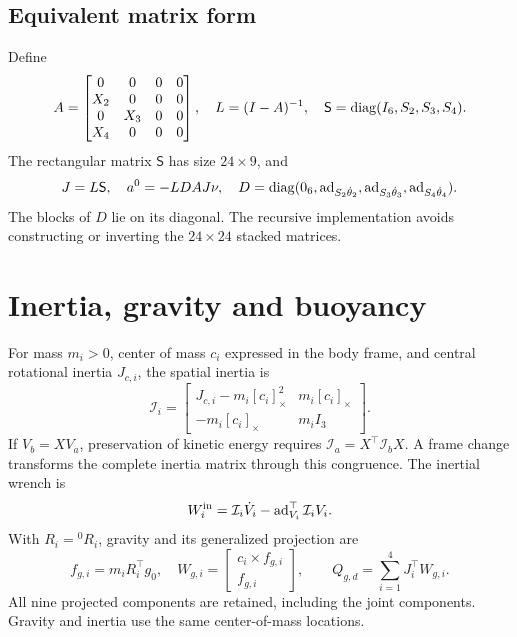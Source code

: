 \documentclass[11pt,a4paper]{article}
\newcommand{\sk}[1]{[#1]_\times}\newcommand{\E}{\mathsf E}\newcommand{\B}{\mathsf B}
\begin{document}
\subsection{Equivalent matrix form}
Define
\begin{equation}
A=\begin{bmatrix}0&0&0&0\\X_2&0&0&0\\0&X_3&0&0\\X_4&0&0&0\end{bmatrix},\quad
L=(I-A)^{-1},\quad \mathsf S=\operatorname{diag}(I_6,S_2,S_3,S_4).
\end{equation}
The rectangular matrix \(\mathsf S\) has size \(24\times9\), and
\begin{equation}
J=L\mathsf S,\quad a^0=-LDAJ\nu,\quad
D=\operatorname{diag}(0_6,\operatorname{ad}_{S_2\dot\theta_2},\operatorname{ad}_{S_3\dot\theta_3},\operatorname{ad}_{S_4\dot\theta_4}).
\label{eq:D}
\end{equation}
The blocks of \(D\) lie on its diagonal. The recursive implementation
avoids constructing or inverting the \(24\times24\) stacked matrices.
\clearpage

\section{Inertia, gravity and buoyancy}
For mass \(m_i>0\), center of mass \(c_i\) expressed in the body frame,
and central rotational inertia \(J_{c,i}\), the spatial inertia is
\begin{equation}
\mathcal I_i=\begin{bmatrix}J_{c,i}-m_i\sk{c_i}^2&m_i\sk{c_i}\\
-m_i\sk{c_i}&m_iI_3\end{bmatrix}.\label{eq:spatial}
\end{equation}
If \(V_b=XV_a\), preservation of kinetic energy requires
\(\mathcal I_a=X^\top\mathcal I_bX\). A frame change transforms the
complete inertia matrix through this congruence. The inertial wrench is
\begin{equation}
W_i^{\rm in}=\mathcal I_i\dot V_i-\operatorname{ad}_{V_i}^\top\mathcal I_iV_i.
\end{equation}
With \(R_i={}^{0}R_i\), gravity and its generalized projection are
\begin{equation}
f_{g,i}=m_iR_i^\top g_0,\quad W_{g,i}=\begin{bmatrix}c_i\times f_{g,i}\\f_{g,i}\end{bmatrix},
\qquad Q_{g,d}=\sum_{i=1}^4J_i^\top W_{g,i}.\label{eq:gravity}
\end{equation}
All nine projected components are retained, including the joint
components. Gravity and inertia use the same center-of-mass locations.
\end{document}
